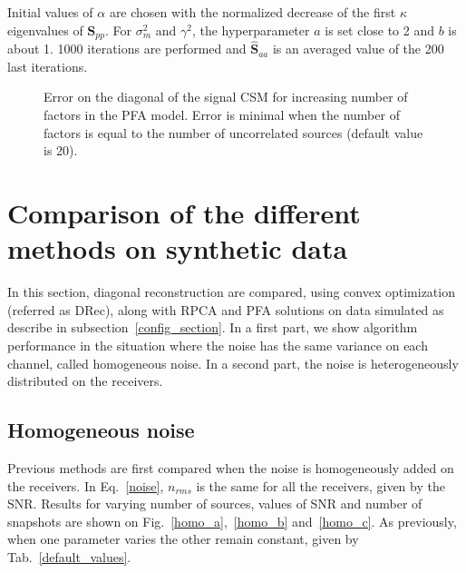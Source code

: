 \documentclass[fontsize=12pt,DIV13,paper=a4,abstract=true,titlepage=false]{scrartcl}
\begin{document}
Initial values of $\alpha$ are chosen with the normalized decrease of the first $\kappa$ eigenvalues of $\bm{S}_{pp}$. For $\sigma_m^2$ and $\gamma^2$, the hyperparameter $a$ is set close to 2 and $b$ is about 1.
1000 iterations are performed and $\bm{\hat{S}}_{aa}$ is an averaged value of the 200 last iterations.
\begin{figure}[h]
	\centering
	
	\caption{Error on the diagonal of the signal CSM for increasing number of factors in the PFA model. Error is minimal when the number of factors is equal to the number of uncorrelated sources (default value is 20).
	\label{factors_FA}}
\end{figure}

\section{Comparison of the different methods on synthetic data}
In this section, diagonal reconstruction are compared, using convex optimization (referred as DRec), along with RPCA and PFA solutions on data simulated as describe in subsection~\ref{config_section}. In a first part, we show algorithm performance in the situation where the noise has the same variance on each channel, called homogeneous noise. In a second part,  the noise is heterogeneously distributed on the receivers.

\subsection{Homogeneous noise}
Previous methods are first compared when the noise is homogeneously added on the receivers. In Eq.~\eqref{noise}, $n_{rms}$ is the same for all the receivers, given by the SNR. Results for varying number of sources,  values of SNR and number of snapshots are shown on Fig.~\ref{homo_a},~\ref{homo_b} and~\ref{homo_c}. As previously, when one parameter varies the other remain constant, given by Tab.~\ref{default_values}.
\end{document}
